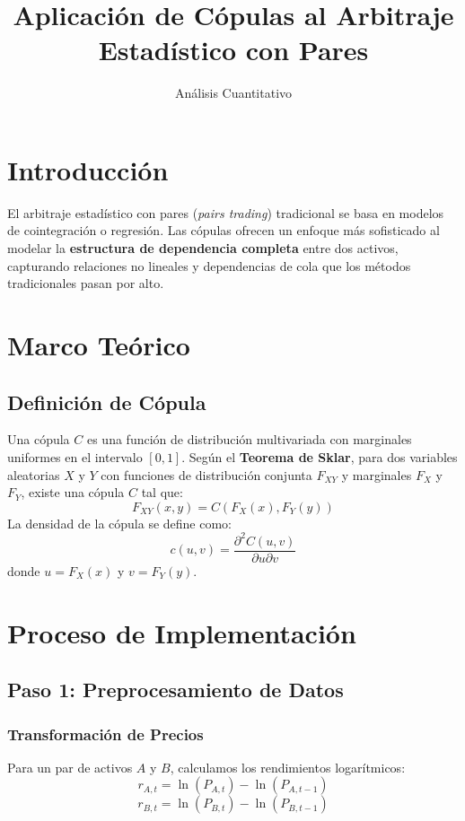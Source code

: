 \documentclass[12pt, a4paper]{myarticle}
\title{Aplicación de Cópulas al Arbitraje Estadístico con Pares}
\author{Análisis Cuantitativo}
\date{}
\begin{document}
\maketitle

\section{Introducción}
El arbitraje estadístico con pares (\textit{pairs trading}) tradicional se basa en modelos de cointegración o regresión. Las cópulas ofrecen un enfoque más sofisticado al modelar la \textbf{estructura de dependencia completa} entre dos activos, capturando relaciones no lineales y dependencias de cola que los métodos tradicionales pasan por alto.

\section{Marco Teórico}

\subsection{Definición de Cópula}
Una cópula \( C \) es una función de distribución multivariada con marginales uniformes en el intervalo \([0,1]\). Según el \textbf{Teorema de Sklar}, para dos variables aleatorias \( X \) y \( Y \) con funciones de distribución conjunta \( F_{XY} \) y marginales \( F_X \) y \( F_Y \), existe una cópula \( C \) tal que:
\[
F_{XY}(x,y) = C(F_X(x), F_Y(y))
\]
La densidad de la cópula se define como:
\[
c(u,v) = \frac{\partial^2 C(u,v)}{\partial u \partial v}
\]
donde \( u = F_X(x) \) y \( v = F_Y(y) \).

\section{Proceso de Implementación}

\subsection{Paso 1: Preprocesamiento de Datos}

\subsubsection{Transformación de Precios}
Para un par de activos \( A \) y \( B \), calculamos los rendimientos logarítmicos:
\[
r_{A,t} = \ln(P_{A,t}) - \ln(P_{A,t-1})
\]
\[
r_{B,t} = \ln(P_{B,t}) - \ln(P_{B,t-1})
\]
\end{document}

